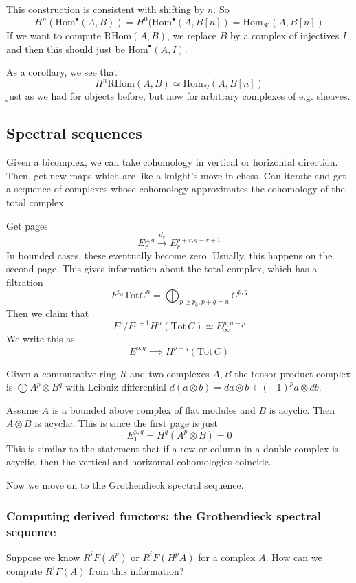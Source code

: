 This construction is consistent with shifting by $n$. So $$H^n(\mathrm{Hom}^\bullet(A,B))=H^0(\mathrm{Hom}^\bullet(A,B[n])=\mathrm{Hom}_{\mathcal{K}}(A,B[n])$$
If we want to compute $\mathrm{RHom}(A,B)$, we replace $B$ by a complex of injectives $I$ and then this should just be $\mathrm{Hom}^\bullet(A,I)$. 

As a corollary, we see that $$H^n\mathrm{RHom}(A,B)\simeq \mathrm{Hom}_{\mathcal{D}}(A,B[n])$$just as we had for objects before, but now for arbitrary complexes of e.g. sheaves.

\subsection{Spectral sequences}

Given a bicomplex, we can take cohomology in vertical or horizontal direction. Then, get new maps which are like a knight's move in chess. Can iterate and get a sequence of complexes whose cohomology approximates the cohomology of the total complex.

Get pages $$E_{r}^{p,q}\xrightarrow{d_{r}} E_{r}^{p+r,q-r+1}$$
In bounded cases, these eventually become zero. Usually, this happens on the second page. This gives information about the total complex, which has a filtration $$F^{p_{0}} \mathrm{Tot}C^n=\bigoplus_{p\geq p_{0}, p+q=n} C^{p,q}$$Then we claim that $$F^p/F^{p+1} H^n(\mathrm{Tot}\,C)\simeq E_{\infty}^{p,n-p}$$We write this as $$E^{p,q}\implies H^{p+q}(\mathrm{Tot}\,C)$$

Given a commutative ring $R$ and two complexes $A,B$ the tensor product complex is $\bigoplus A^p\otimes B^q$ with Leibniz differential $d(a\otimes b)=da\otimes b + (-1)^p a\otimes db$. 

Assume $A$ is a bounded above complex of flat modules and $B$ is acyclic. Then $A\otimes B$ is acyclic. This is since the first page is just $$E_{1}^{p,q}=H^q(A^p\otimes B)=0$$
This is similar to the statement that if a row or column in a double complex is acyclic, then the vertical and horizontal cohomologies coincide.

Now we move on to the Grothendieck spectral sequence.

\subsubsection{Computing derived functors: the Grothendieck spectral sequence}

Suppose we know $R^iF(A^p)$ or $R^iF(H^pA)$ for a complex $A$. How can we compute $R^iF(A)$ from this information?

